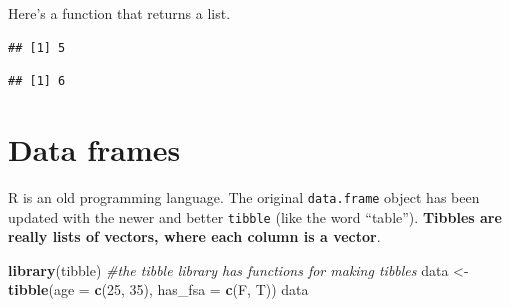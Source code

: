 \documentclass[]{book}
\newenvironment{Shaded}{\begin{snugshade}}{\end{snugshade}}
\newcommand{\CommentTok}[1]{\textcolor[rgb]{0.56,0.35,0.01}{\textit{#1}}}
\newcommand{\ControlFlowTok}[1]{\textcolor[rgb]{0.13,0.29,0.53}{\textbf{#1}}}
\newcommand{\DataTypeTok}[1]{\textcolor[rgb]{0.13,0.29,0.53}{#1}}
\newcommand{\DecValTok}[1]{\textcolor[rgb]{0.00,0.00,0.81}{#1}}
\newcommand{\KeywordTok}[1]{\textcolor[rgb]{0.13,0.29,0.53}{\textbf{#1}}}
\newcommand{\NormalTok}[1]{#1}
\newcommand{\OperatorTok}[1]{\textcolor[rgb]{0.81,0.36,0.00}{\textbf{#1}}}
\newcommand{\StringTok}[1]{\textcolor[rgb]{0.31,0.60,0.02}{#1}}
\begin{document}
Here's a function that returns a list.

\begin{Shaded}
\end{Shaded}

\begin{verbatim}
## [1] 5
\end{verbatim}

\begin{Shaded}
\end{Shaded}

\begin{verbatim}
## [1] 6
\end{verbatim}

\hypertarget{data-frames}{%
\section{Data frames}\label{data-frames}}

R is an old programming language. The original \texttt{data.frame} object has been updated with the newer and better \texttt{tibble} (like the word ``table''). \textbf{Tibbles are really lists of vectors, where each column is a vector}.

\begin{Shaded}
\begin{Highlighting}[]
\KeywordTok{library}\NormalTok{(tibble) }\CommentTok{#the tibble library has functions for making tibbles}
\NormalTok{data <-}\StringTok{ }\KeywordTok{tibble}\NormalTok{(}\DataTypeTok{age =} \KeywordTok{c}\NormalTok{(}\DecValTok{25}\NormalTok{, }\DecValTok{35}\NormalTok{), }\DataTypeTok{has_fsa =} \KeywordTok{c}\NormalTok{(F, T))}
\NormalTok{data}
\end{Highlighting}
\end{Shaded}
\end{document}
